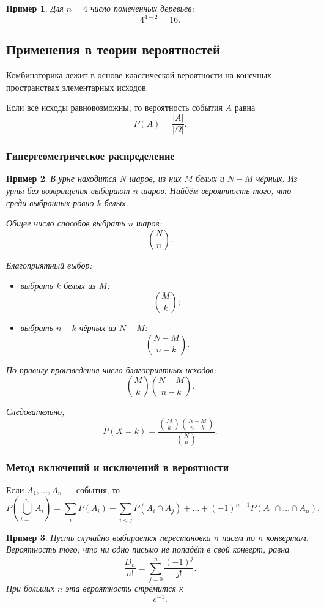 \documentclass[12pt,a4paper]{article}
\newtheorem{example}{Пример}
\begin{document}
\begin{example}
Для $n=4$ число помеченных деревьев:
\[
4^{4-2}=16.
\]
\end{example}

\subsection{Применения в теории вероятностей}

Комбинаторика лежит в основе классической вероятности на конечных пространствах элементарных исходов.

Если все исходы равновозможны, то вероятность события $A$ равна
\[
P(A)=\frac{|A|}{|\Omega|}.
\]

\subsubsection{Гипергеометрическое распределение}

\begin{example}
В урне находится $N$ шаров, из них $M$ белых и $N-M$ чёрных. Из урны без возвращения выбирают $n$ шаров. Найдём вероятность того, что среди выбранных ровно $k$ белых.

Общее число способов выбрать $n$ шаров:
\[
\binom{N}{n}.
\]

Благоприятный выбор:
\begin{itemize}
    \item выбрать $k$ белых из $M$:
    \[
    \binom{M}{k};
    \]
    \item выбрать $n-k$ чёрных из $N-M$:
    \[
    \binom{N-M}{n-k}.
    \]
\end{itemize}

По правилу произведения число благоприятных исходов:
\[
\binom{M}{k}\binom{N-M}{n-k}.
\]

Следовательно,
\[
P(X=k)=
\frac{\binom{M}{k}\binom{N-M}{n-k}}{\binom{N}{n}}.
\]
\end{example}

\subsubsection{Метод включений и исключений в вероятности}

Если $A_1,\dots,A_n$ --- события, то
\[
P\left(\bigcup_{i=1}^{n}A_i\right)
=
\sum_i P(A_i)
-
\sum_{i<j}P(A_i\cap A_j)
+\dots+
(-1)^{n+1}P(A_1\cap\dots\cap A_n).
\]

\begin{example}
Пусть случайно выбирается перестановка $n$ писем по $n$ конвертам. Вероятность того, что ни одно письмо не попадёт в свой конверт, равна
\[
\frac{D_n}{n!}
=
\sum_{j=0}^{n}\frac{(-1)^j}{j!}.
\]
При больших $n$ эта вероятность стремится к
\[
e^{-1}.
\]
\end{example}
\end{document}
